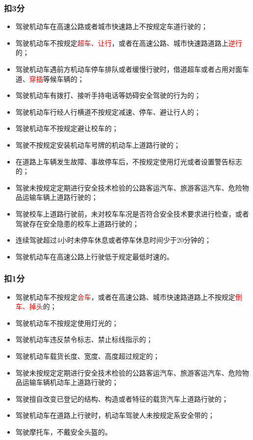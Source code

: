 \subsubsection*{扣3分}

\begin{itemize}
    \item 驾驶机动车在高速公路或者城市快速路上不按规定车道行驶的；
    \item 驾驶机动车不按规定\textcolor{red}{超车、让行}，或者在高速公路、城市快速路道路上\textcolor{red}{逆行}的；
    \item 驾驶机动车遇前方机动车停车排队或者缓慢行驶时，借道超车或者占用对面车道、\textcolor{red}{穿插}等候车辆的；
    \item 驾驶机动车有拨打、接听手持电话等妨碍安全驾驶的行为的；
    \item 驾驶机动车行经人行横道不按规定减速、停车、避让行人的；
    \item 驾驶机动车不按规定避让校车的；
    \item 驾驶不按规定安装机动车号牌的机动车上道路行驶的；
    \item 在道路上车辆发生故障、事故停车后，不按规定使用灯光或者设置警告标志的；
    \item 驾驶未按规定定期进行安全技术检验的公路客运汽车、旅游客运汽车、危险物品运输车辆上道路行驶的；
    \item 驾驶校车上道路行驶前，未对校车车况是否符合安全技术要求进行检查，或者驾驶存在安全隐患的校车上道路行驶的；
    \item 连续驾驶超过4小时未停车休息或者停车休息时间少于20分钟的；
    \item 驾驶机动车在高速公路上行驶低于规定最低时速的。
\end{itemize}

\subsubsection*{扣1分}

\begin{itemize}
    \item 驾驶机动车不按规定\textcolor{red}{会车}，或者在高速公路、城市快速路道路上不按规定\textcolor{red}{倒车、掉头}的；
    \item 驾驶机动车不按规定使用灯光的；
    \item 驾驶机动车违反禁令标志、禁止标线指示的；
    \item 驾驶机动车载货长度、宽度、高度超过规定的；
    \item 驾驶未按规定定期进行安全技术检验的公路客运汽车、旅游客运汽车、危险物品运输车辆机动车上道路行驶的；
    \item 驾驶擅自改变已登记的结构、构造或者特征的载货汽车上道路行驶的；
    \item 驾驶机动车在道路上行驶时，机动车驾驶人未按规定系安全带的；
    \item 驾驶摩托车，不戴安全头盔的。
\end{itemize}